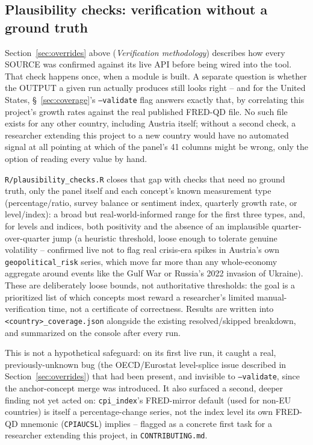 \documentclass[11pt]{article}
\begin{document}
\subsection{Plausibility checks: verification without a ground truth}
\label{sec:plausibility}

Section~\ref{sec:overrides} above (\emph{Verification methodology}) describes
how every SOURCE was confirmed against its live API before being wired
into the tool. That check happens once, when a module is built. A
separate question is whether the OUTPUT a given run actually produces
still looks right -- and for the United States, \S~\ref{sec:coverage}'s
\texttt{--validate} flag answers exactly that, by correlating this
project's growth rates against the real published FRED-QD file. No such
file exists for any other country, including Austria itself; without a
second check, a researcher extending this project to a new country would
have no automated signal at all pointing at which of the panel's 41
columns might be wrong, only the option of reading every value by hand.

\texttt{R/plausibility\_checks.R} closes that gap with checks that need
no ground truth, only the panel itself and each concept's known
measurement type (percentage/ratio, survey balance or sentiment index,
quarterly growth rate, or level/index): a broad but real-world-informed
range for the first three types, and, for levels and indices, both
positivity and the absence of an implausible quarter-over-quarter jump
(a heuristic threshold, loose enough to tolerate genuine volatility --
confirmed live not to flag real crisis-era spikes in Austria's own
\texttt{geopolitical\_risk} series, which move far more than any
whole-economy aggregate around events like the Gulf War or Russia's 2022
invasion of Ukraine). These are deliberately loose bounds, not
authoritative thresholds: the goal is a prioritized list of which
concepts most reward a researcher's limited manual-verification time, not
a certificate of correctness. Results are written into
\texttt{<country>\_coverage.json} alongside the existing resolved/skipped
breakdown, and summarized on the console after every run.

This is not a hypothetical safeguard: on its first live run, it caught a
real, previously-unknown bug (the OECD/Eurostat level-splice issue
described in Section~\ref{sec:overrides}) that had been present, and
invisible to \texttt{--validate}, since the anchor-concept merge was
introduced. It also surfaced a second, deeper finding not yet acted on:
\texttt{cpi\_index}'s FRED-mirror default (used for non-EU countries) is
itself a percentage-change series, not the index level its own FRED-QD
mnemonic (\texttt{CPIAUCSL}) implies -- flagged as a concrete first task
for a researcher extending this project, in \texttt{CONTRIBUTING.md}.
\end{document}
